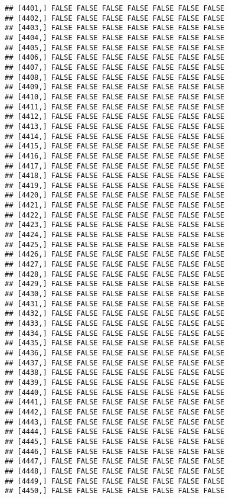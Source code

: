 \documentclass[
]{article}
\begin{document}
\begin{verbatim}
## [4401,] FALSE FALSE FALSE FALSE FALSE FALSE FALSE
## [4402,] FALSE FALSE FALSE FALSE FALSE FALSE FALSE
## [4403,] FALSE FALSE FALSE FALSE FALSE FALSE FALSE
## [4404,] FALSE FALSE FALSE FALSE FALSE FALSE FALSE
## [4405,] FALSE FALSE FALSE FALSE FALSE FALSE FALSE
## [4406,] FALSE FALSE FALSE FALSE FALSE FALSE FALSE
## [4407,] FALSE FALSE FALSE FALSE FALSE FALSE FALSE
## [4408,] FALSE FALSE FALSE FALSE FALSE FALSE FALSE
## [4409,] FALSE FALSE FALSE FALSE FALSE FALSE FALSE
## [4410,] FALSE FALSE FALSE FALSE FALSE FALSE FALSE
## [4411,] FALSE FALSE FALSE FALSE FALSE FALSE FALSE
## [4412,] FALSE FALSE FALSE FALSE FALSE FALSE FALSE
## [4413,] FALSE FALSE FALSE FALSE FALSE FALSE FALSE
## [4414,] FALSE FALSE FALSE FALSE FALSE FALSE FALSE
## [4415,] FALSE FALSE FALSE FALSE FALSE FALSE FALSE
## [4416,] FALSE FALSE FALSE FALSE FALSE FALSE FALSE
## [4417,] FALSE FALSE FALSE FALSE FALSE FALSE FALSE
## [4418,] FALSE FALSE FALSE FALSE FALSE FALSE FALSE
## [4419,] FALSE FALSE FALSE FALSE FALSE FALSE FALSE
## [4420,] FALSE FALSE FALSE FALSE FALSE FALSE FALSE
## [4421,] FALSE FALSE FALSE FALSE FALSE FALSE FALSE
## [4422,] FALSE FALSE FALSE FALSE FALSE FALSE FALSE
## [4423,] FALSE FALSE FALSE FALSE FALSE FALSE FALSE
## [4424,] FALSE FALSE FALSE FALSE FALSE FALSE FALSE
## [4425,] FALSE FALSE FALSE FALSE FALSE FALSE FALSE
## [4426,] FALSE FALSE FALSE FALSE FALSE FALSE FALSE
## [4427,] FALSE FALSE FALSE FALSE FALSE FALSE FALSE
## [4428,] FALSE FALSE FALSE FALSE FALSE FALSE FALSE
## [4429,] FALSE FALSE FALSE FALSE FALSE FALSE FALSE
## [4430,] FALSE FALSE FALSE FALSE FALSE FALSE FALSE
## [4431,] FALSE FALSE FALSE FALSE FALSE FALSE FALSE
## [4432,] FALSE FALSE FALSE FALSE FALSE FALSE FALSE
## [4433,] FALSE FALSE FALSE FALSE FALSE FALSE FALSE
## [4434,] FALSE FALSE FALSE FALSE FALSE FALSE FALSE
## [4435,] FALSE FALSE FALSE FALSE FALSE FALSE FALSE
## [4436,] FALSE FALSE FALSE FALSE FALSE FALSE FALSE
## [4437,] FALSE FALSE FALSE FALSE FALSE FALSE FALSE
## [4438,] FALSE FALSE FALSE FALSE FALSE FALSE FALSE
## [4439,] FALSE FALSE FALSE FALSE FALSE FALSE FALSE
## [4440,] FALSE FALSE FALSE FALSE FALSE FALSE FALSE
## [4441,] FALSE FALSE FALSE FALSE FALSE FALSE FALSE
## [4442,] FALSE FALSE FALSE FALSE FALSE FALSE FALSE
## [4443,] FALSE FALSE FALSE FALSE FALSE FALSE FALSE
## [4444,] FALSE FALSE FALSE FALSE FALSE FALSE FALSE
## [4445,] FALSE FALSE FALSE FALSE FALSE FALSE FALSE
## [4446,] FALSE FALSE FALSE FALSE FALSE FALSE FALSE
## [4447,] FALSE FALSE FALSE FALSE FALSE FALSE FALSE
## [4448,] FALSE FALSE FALSE FALSE FALSE FALSE FALSE
## [4449,] FALSE FALSE FALSE FALSE FALSE FALSE FALSE
## [4450,] FALSE FALSE FALSE FALSE FALSE FALSE FALSE

\end{verbatim}
\end{document}
